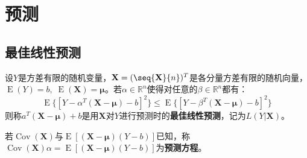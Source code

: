 \section{预测}

\subsection{最佳线性预测}
\begin{definition}
	设$Y$是方差有限的随机变量，$\mathbf{X}=(\seq{\mathbf{X}}{n})^T$是各分量方差有限的随机向量，$\operatorname{E}(Y)=b,\;\operatorname{E}(\mathbf{X})=\boldsymbol{\mu}$。若$\alpha\in\mathbb{R}^{n}$使得对任意的$\beta\in\mathbb{R}^{n}$都有：
	\begin{equation*}
		\operatorname{E}\{[Y-\alpha^T(\mathbf{X}-\boldsymbol{\mu})-b]^2\}\leqslant\operatorname{E}\{[Y-\beta^T(\mathbf{X}-\boldsymbol{\mu})-b]^2\}
	\end{equation*}
	则称$a^T(\mathbf{X}-\boldsymbol{\mu})+b$是用$\mathbf{X}$对$Y$进行预测时的\textbf{最佳线性预测}，记为$L(Y|\mathbf{X})$。
\end{definition}
\begin{definition}
	若$\operatorname{Cov}(\mathbf{X})$与$\operatorname{E}[(\mathbf{X}-\boldsymbol{\mu})(Y-b)]$已知，称$\operatorname{Cov}(\mathbf{X})\alpha=\operatorname{E}[(\mathbf{X}-\boldsymbol{\mu})(Y-b)]$为\textbf{预测方程}。
\end{definition}
